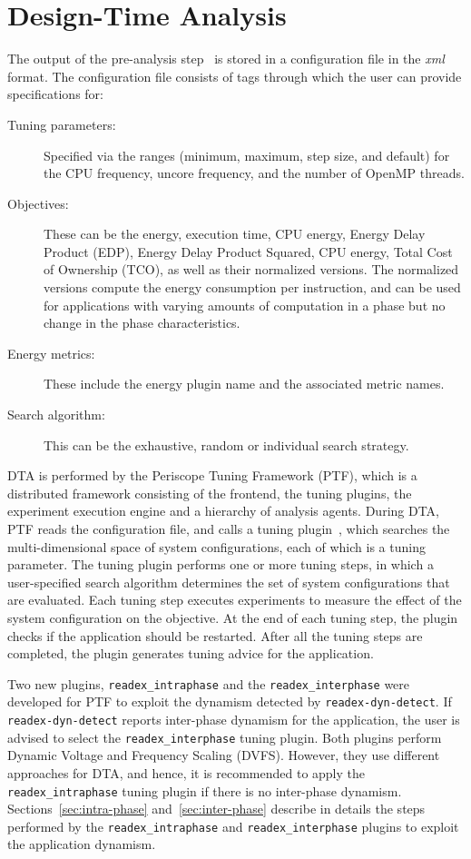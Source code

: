 \section{Design-Time Analysis} \label{sec:dta}
The output of the pre-analysis step~\cite{kumaraswamy2018design} is stored in a configuration file in the \textit{xml} format. The configuration file consists of tags through which the user can provide specifications for:
\begin{description}
	\item [Tuning parameters:] Specified via the ranges (minimum, maximum, step size, and default) for the CPU frequency, uncore frequency, and the number of OpenMP threads.
	\item [Objectives:] These can be the energy, execution time, CPU energy, Energy Delay Product (EDP), Energy Delay Product Squared, CPU energy, Total Cost of Ownership (TCO), as well as their normalized versions. The normalized versions compute the energy consumption per instruction, and can be used for applications with varying amounts of computation in a phase but no change in the phase characteristics.
	\item [Energy metrics:] These include the energy plugin name and the associated metric names. 
	\item [Search algorithm:] This can be the exhaustive, random or individual search strategy.
\end{description}

DTA is performed by the Periscope Tuning Framework (PTF), which is a distributed framework consisting of the frontend, the tuning plugins, the experiment execution engine and a hierarchy of analysis agents. During DTA, PTF reads the configuration file, and calls a tuning plugin~\cite{AutoTune:Book2015}, which searches the multi-dimensional space of system configurations, each of which is a tuning parameter. The tuning plugin performs one or more tuning steps, in which a user-specified search algorithm determines the set of system configurations that are evaluated. Each tuning step executes experiments to measure the effect of the system configuration on the objective. At the end of each tuning step, the plugin checks if the application should be restarted. After all the tuning steps are completed, the plugin generates tuning advice for the application.

Two new plugins, \texttt{readex\_intraphase} and the \texttt{readex\_interphase} were developed for PTF to exploit the dynamism detected by \texttt{readex-dyn-detect}. If \texttt{readex-dyn-detect} reports inter-phase dynamism for the application, the user is advised to select the \texttt{readex\_interphase} tuning plugin. Both plugins perform Dynamic Voltage and Frequency Scaling (DVFS). However, they use different approaches for DTA, and hence, it is recommended to apply the \texttt{readex\_intraphase} tuning plugin if there is no inter-phase dynamism. Sections~\ref{sec:intra-phase} and~\ref{sec:inter-phase} describe in details the steps performed by the \texttt{readex\_intraphase} and \texttt{readex\_interphase} plugins to exploit the application dynamism.


